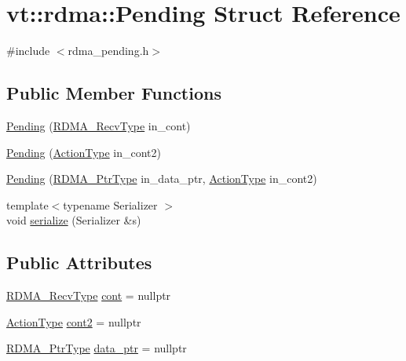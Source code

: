 \hypertarget{structvt_1_1rdma_1_1_pending}{}\section{vt\+:\+:rdma\+:\+:Pending Struct Reference}
\label{structvt_1_1rdma_1_1_pending}


{\ttfamily \#include $<$rdma\+\_\+pending.\+h$>$}

\subsection*{Public Member Functions}
\begin{DoxyCompactItemize}
\item 
\hyperlink{structvt_1_1rdma_1_1_pending_ab4ba68847f206e200ece5844f0bb6896}{Pending} (\hyperlink{namespacevt_1_1rdma_aa07fa86d8eca8853254b40fc0e565726}{R\+D\+M\+A\+\_\+\+Recv\+Type} in\+\_\+cont)
\item 
\hyperlink{structvt_1_1rdma_1_1_pending_a44bf0bdd07500e633545b82d8fb7bc35}{Pending} (\hyperlink{namespacevt_ae0a5a7b18cc99d7b732cb4d44f46b0f3}{Action\+Type} in\+\_\+cont2)
\item 
\hyperlink{structvt_1_1rdma_1_1_pending_ad14318ac7c35b7fc7ff8ec91b30004e5}{Pending} (\hyperlink{namespacevt_a9e2c953286c7616f7c218e9951790776}{R\+D\+M\+A\+\_\+\+Ptr\+Type} in\+\_\+data\+\_\+ptr, \hyperlink{namespacevt_ae0a5a7b18cc99d7b732cb4d44f46b0f3}{Action\+Type} in\+\_\+cont2)
\item 
{\footnotesize template$<$typename Serializer $>$ }\\void \hyperlink{structvt_1_1rdma_1_1_pending_a51e5a244bd917195174c58a076199c36}{serialize} (Serializer \&s)
\end{DoxyCompactItemize}
\subsection*{Public Attributes}
\begin{DoxyCompactItemize}
\item 
\hyperlink{namespacevt_1_1rdma_aa07fa86d8eca8853254b40fc0e565726}{R\+D\+M\+A\+\_\+\+Recv\+Type} \hyperlink{structvt_1_1rdma_1_1_pending_a379b732d7dfcd5fd42346c85583b8e08}{cont} = nullptr
\item 
\hyperlink{namespacevt_ae0a5a7b18cc99d7b732cb4d44f46b0f3}{Action\+Type} \hyperlink{structvt_1_1rdma_1_1_pending_a55d01ceada3293160e3167eb7194b9bd}{cont2} = nullptr
\item 
\hyperlink{namespacevt_a9e2c953286c7616f7c218e9951790776}{R\+D\+M\+A\+\_\+\+Ptr\+Type} \hyperlink{structvt_1_1rdma_1_1_pending_afcbb4951a3cfaa8981063487c0b90548}{data\+\_\+ptr} = nullptr
\end{DoxyCompactItemize}



